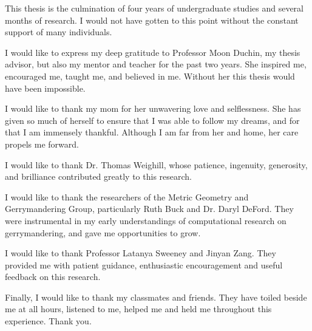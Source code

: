 
This thesis is the culmination of four years of undergraduate studies and several months of research. I would not have gotten to this point without the constant support of many individuals.

I would like to express my deep gratitude to Professor Moon Duchin, my thesis advisor, but also my mentor and teacher for the past two years. She inspired me, encouraged me, taught me, and believed in me. Without her this thesis would have been impossible.

I would like to thank my mom for her unwavering love and selflessness. She has given so much of herself to ensure that I was able to follow my dreams, and for that I am immensely thankful. Although I am far from her and home, her care propels me forward.

I would like to thank Dr. Thomas Weighill, whose patience, ingenuity, generosity, and brilliance contributed greatly to this research.

I would like to thank the researchers of the Metric Geometry and Gerrymandering Group, particularly Ruth Buck and Dr. Daryl DeFord. They were instrumental in my early understandings of computational research on gerrymandering, and gave me opportunities to grow.

I would like to thank Professor Latanya Sweeney and Jinyan Zang. They provided me with patient guidance, enthusiastic encouragement and useful feedback on this research.

Finally, I would like to thank my classmates and friends. They have toiled beside me at all hours, listened to me, helped me and held me throughout this experience. Thank you.
